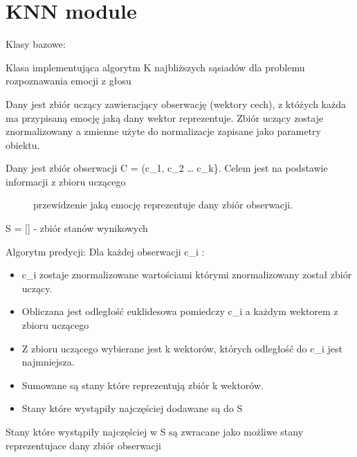 \documentclass[letterpaper,10pt,polish]{sphinxmanual}
\begin{document}
\section{KNN module}
\label{\detokenize{KNN:module-KNN}}\label{\detokenize{KNN::doc}}\label{\detokenize{KNN:knn-module}}

\begin{fulllineitems}
\label{\detokenize{KNN:KNN.KNN}}
Klasy bazowe: 

Klasa implementująca algorytm K najbliższych sąsiadów dla problemu rozpoznawania emocji z głosu

Dany jest zbiór uczący zawieracjący obserwację (wektory cech), z któżych każda ma przypisaną emocję jaką dany wektor
reprezentuje. Zbiór uczący zostaje znormalizowany a zmienne użyte do normalizacje zapisane jako parametry obiektu.
\begin{description}
\item[{Dany jest zbiór obserwacji C = (c\_1, c\_2 … c\_k\}. Celem jest na podstawie informacji z zbioru uczącego}] \leavevmode
przewidzenie jaką emocję reprezentuje dany zbiór obserwacji.

\end{description}

S = {[}{]} - zbiór stanów wynikowych

Algorytm predycji:
Dla każdej obserwacji c\_i :
\begin{itemize}
\item {} 
c\_i zostaje znormalizowane wartościami którymi znormalizowany został zbiór uczący.

\item {} 
Obliczana jest odległość euklidesowa pomiedczy c\_i a każdym wektorem z zbioru uczącego

\item {} 
Z zbioru uczącego wybierane jest k wektorów, których odległość do c\_i jest najmniejsza.

\item {} 
Sumowane są stany które reprezentują zbiór k wektorów.

\item {} 
Stany które wystąpiły najczęściej dodawane są do S

\end{itemize}

Stany które wystąpiły najczęściej w S są zwracane jako możliwe stany reprezentujace dany zbiór obserwacji


\end{fulllineitems}
\end{document}
